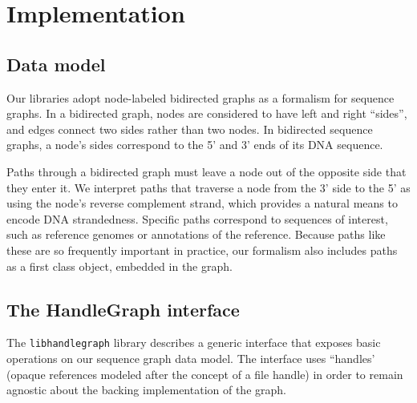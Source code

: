 \documentclass{article}
\begin{document}



\section{Implementation}

\subsection{Data model}

Our libraries adopt node-labeled bidirected graphs as a formalism for sequence graphs.
In a bidirected graph, nodes are considered to have left and right ``sides'', and edges connect two sides rather than two nodes.
In bidirected sequence graphs, a node's sides correspond to the 5' and 3' ends of its DNA sequence. 

Paths through a bidirected graph must leave a node out of the opposite side that they enter it.
We interpret paths that traverse a node from the 3' side to the 5' as using the node's reverse complement strand, which provides a natural means to encode DNA strandedness.
Specific paths correspond to sequences of interest, such as reference genomes or annotations of the reference.
Because paths like these are so frequently important in practice, our formalism also includes paths as a first class object, embedded in the graph.

\subsection{The HandleGraph interface}

The \texttt{libhandlegraph} library describes a generic interface that exposes basic operations on our sequence graph data model.
The interface uses ``handles' (opaque references modeled after the concept of a file handle) in order to remain agnostic about the backing implementation of the graph.
\end{document}
